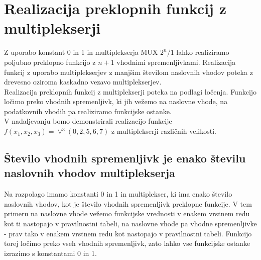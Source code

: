 \section{Realizacija preklopnih funkcij z multiplekserji}

Z uporabo konstant 0 in 1 in multiplekserja MUX $2^n/1$ lahko realiziramo poljubno preklopno funkcijo z $n+1$ vhodnimi spremenljivkami. Realizacija funkcij z uporabo multiplekserjev z manjšim številom naslovnih vhodov poteka z drevesno oziroma kaskadno vezavo multiplekserjev.\\

Realizacija preklopnih funkcij z multiplekserji poteka na podlagi ločenja. Funkcijo ločimo preko vhodnih spremenljivk, ki jih vežemo na naslovne vhode, na podatkovnih vhodih pa realiziramo funkcijske ostanke.\\

V nadaljevanju bomo demonstrirali realizacijo funkcije $f(x_1, x_2, x_3) = \vee^3(0, 2, 5, 6, 7)$ z multiplekserji različnih velikosti.

\subsection{Število vhodnih spremenljivk je enako številu naslovnih vhodov multiplekserja}

Na razpolago imamo konstanti 0 in 1 in multiplekser, ki ima enako število naslovnih vhodov, kot je število vhodnih spremenljivk preklopne funkcije. V tem primeru na naslovne vhode vežemo funkcijske vrednosti v enakem vrstnem redu kot ti nastopajo v pravilnostni tabeli, na naslovne vhode pa vhodne spremenljivke - prav tako v enakem vrstnem redu kot nastopajo v pravilnostni tabeli. Funkcijo torej ločimo preko vseh vhodnih spremenljivk, zato lahko vse funkcijske ostanke izrazimo s konstantami 0 in 1.

